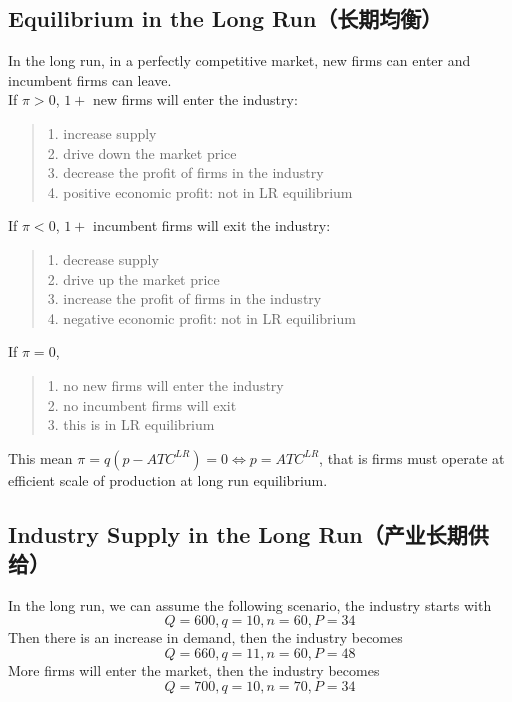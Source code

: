 \subsection{Equilibrium in the Long Run（长期均衡）}
In the long run, in a perfectly competitive market, new firms can enter and incumbent firms can leave. \\
If $\pi > 0$, $1+$ new firms will enter the industry:
\begin{quote}
    1. increase supply \\
    2. drive down the market price \\
    3. decrease the profit of firms in the industry \\
    4. positive economic profit: not in LR equilibrium
\end{quote}
If $\pi < 0$, $1+$ incumbent firms will exit the industry:
\begin{quote}
    1. decrease supply \\
    2. drive up the market price \\
    3. increase the profit of firms in the industry \\
    4. negative economic profit: not in LR equilibrium
\end{quote}
If $\pi = 0$,
\begin{quote}
    1. no new firms will enter the industry \\
    2. no incumbent firms will exit \\
    3. this is in LR equilibrium
\end{quote}
This mean $\pi = q(p - ATC^{LR}) = 0 \iff  p = ATC^{LR}$, that is firms must operate at efficient scale of production at long run equilibrium.

\subsection{Industry Supply in the Long Run（产业长期供给）}
In the long run, we can assume the following scenario, the industry starts with
$$Q = 600, q = 10, n = 60, P = 34$$
Then there is an increase in demand, then the industry becomes
$$Q = 660, q = 11, n = 60, P = 48$$
More firms will enter the market, then the industry becomes
$$Q = 700, q = 10, n = 70, P = 34$$

\newpage